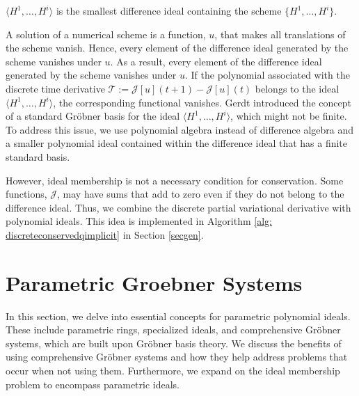 \documentclass[runningheads]{llncs}
\newcommand{\1}{\chi}
\begin{document}
\begin{definition}
	$\langle H^1,\ldots,H^i\rangle$ is the smallest difference ideal containing the scheme $\{H^1,\ldots,H^i\}$.
\end{definition}


A solution of a numerical scheme is a function, $u$, that makes all translations of the scheme vanish. Hence, every element of the difference ideal generated by the scheme vanishes under $u$. As a result, every element of the difference ideal generated by the scheme vanishes under $u$. If the polynomial associated with the discrete time derivative  $\mathcal{T}:=\mathcal{J}[u](t+1)-\mathcal{J}[u](t)$
belongs to the ideal $\langle H^1,\ldots,H^i\rangle$, the corresponding functional vanishes. 
 Gerdt introduced the concept of a standard  Gr{\"o}bner basis for the ideal $\langle H^1,\ldots,H^i\rangle$, which might not be finite. To address this issue, we use polynomial algebra instead of difference algebra and a smaller polynomial ideal contained within the difference ideal that has a finite standard basis.
 
 However, ideal membership is not  a necessary condition for conservation. Some functions, $\mathcal{J}$,
 may have sums that add to zero even if they do not belong to the difference ideal. Thus, we combine the discrete partial variational derivative with polynomial ideals. This idea is implemented in Algorithm \ref{alg: discreteconservedqimplicit} in Section \ref{secgen}.












 \newpage 
\section{Parametric Groebner Systems}
\label{pgs}

In this section, we delve into essential concepts for 
parametric polynomial ideals. These include parametric rings, 
specialized ideals, and comprehensive Gr{\"o}bner systems, which are built upon 
Gr{\"o}bner basis theory. 
We discuss the benefits of using comprehensive Gr{\"o}bner systems 
and how they help address problems that occur when not using them. 
Furthermore, we expand on the ideal membership problem to encompass parametric ideals.
\end{document}
